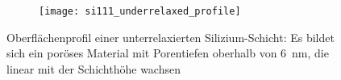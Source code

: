 \begin{figure}[H]
  \centering
  \captionsetup[subfigure]{singlelinecheck=false}
  \begin{subfigure}[t]{7.1cm}
    \texttt{[image: si111\_underrelaxed\_profile]}
  \end{subfigure}
  \begin{subfigure}[t]{1.7cm}
    \def\svgwidth{\textwidth}
    
  \end{subfigure}
  \caption[Oberflächenprofil einer unterrelaxierten Siliziumschicht]{
    Oberflächenprofil einer unterrelaxierten Silizium-Schicht:
    Es bildet sich ein poröses Material mit Porentiefen oberhalb von \SI{6}{\nano\meter}, die linear mit der Schichthöhe wachsen
  }
  \label{fig:siliconunderrelaxedprofile}
\end{figure}
